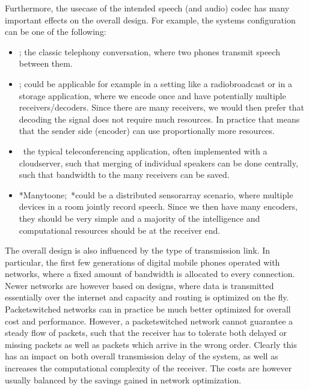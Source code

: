 \documentclass[letterpaper,10pt,english]{jupyterBook}
\begin{document}
\sphinxAtStartPar
Furthermore, the use\sphinxhyphen{}case of the intended speech (and audio) codec has
many important effects on the overall design. For example, the systems
configuration can be one of the following:
\begin{itemize}
\item {} 
\sphinxAtStartPar
{}; the classic telephony conversation, where two phones
transmit speech between them.

\item {} 
\sphinxAtStartPar
{}; could be applicable for example in a setting like a
radio\sphinxhyphen{}broadcast or in a storage application, where we encode once
and have potentially multiple receivers/decoders. Since there are
many receivers, we would then prefer that decoding the signal does
not require much resources. In practice that means that the sender
side (encoder) can use proportionally more resources.

\item {} 
\sphinxAtStartPar
{} the typical teleconferencing application, often
implemented with a cloud\sphinxhyphen{}server, such that merging of individual
speakers can be done centrally, such that bandwidth to the many
receivers can be saved.

\item {} 
\sphinxAtStartPar
*Many\sphinxhyphen{}to\sphinxhyphen{}one; *could be a distributed sensor\sphinxhyphen{}array scenario, where
multiple devices in a room jointly record speech. Since we then have
many encoders, they should be very simple and a majority of the
intelligence and computational resources should be at the receiver
end.

\end{itemize}

\sphinxAtStartPar
The overall design is also influenced by the type of transmission link.
In particular, the first few generations of digital mobile phones
operated with
networks, where a fixed amount of bandwidth is allocated to every
connection. Newer networks are however based on
designs, where data is transmitted essentially over the internet and
capacity and routing is optimized on the fly. Packet\sphinxhyphen{}switched networks
can in practice be much better optimized for overall cost and
performance. However, a packet\sphinxhyphen{}switched network cannot guarantee a
steady flow of packets, such that the receiver has to tolerate both
delayed or missing packets as well as packets which arrive in the wrong
order. Clearly this has an impact on both overall transmission delay of
the system, as well as increases the computational complexity of the
receiver. The costs are however usually balanced by the savings gained
in network optimization.
\end{document}
